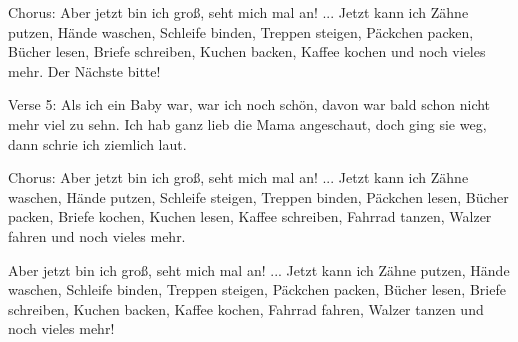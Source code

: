 \begin{multicols}{2}
\begin{lstsong}
Chorus:
Aber jetzt bin ich groß, seht mich mal an! ...
Jetzt kann ich Zähne putzen, Hände waschen,
Schleife binden, Treppen steigen, Päckchen packen,
Bücher lesen, Briefe schreiben,
Kuchen backen, Kaffee kochen
und noch vieles mehr.        Der Nächste bitte!

Verse 5:
Als ich ein Baby war, war ich noch schön,
davon war bald schon nicht mehr viel zu sehn.
Ich hab ganz lieb die Mama angeschaut,
doch ging sie weg, dann schrie ich ziemlich laut.

Chorus:
Aber jetzt bin ich groß, seht mich mal an! ...
Jetzt kann ich Zähne waschen, Hände putzen,
Schleife steigen, Treppen binden, Päckchen lesen,
Bücher packen, Briefe kochen,
Kuchen lesen, Kaffee schreiben,
Fahrrad tanzen, Walzer fahren
und noch vieles mehr.

Aber jetzt bin ich groß, seht mich mal an! ...
Jetzt kann ich Zähne putzen, Hände waschen,
Schleife binden, Treppen steigen, Päckchen packen,
Bücher lesen, Briefe schreiben,
Kuchen backen, Kaffee kochen,
Fahrrad fahren, Walzer tanzen
und noch vieles mehr!
\end{lstsong}
\end{multicols}
\newpage

